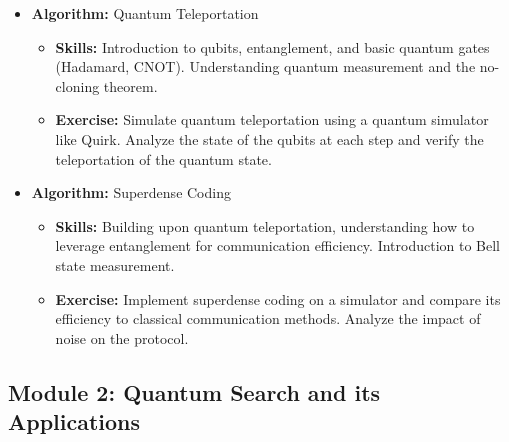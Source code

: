 \begin{itemize}
    \item \textbf{Algorithm:} Quantum Teleportation
    \begin{itemize}
        \item \textbf{Skills:} Introduction to qubits, entanglement, and basic quantum gates (Hadamard, CNOT). Understanding quantum measurement and the no-cloning theorem.
        \item \textbf{Exercise:} Simulate quantum teleportation using a quantum simulator like Quirk. Analyze the state of the qubits at each step and verify the teleportation of the quantum state.
    \end{itemize}
    
    \item \textbf{Algorithm:} Superdense Coding
    \begin{itemize}
        \item \textbf{Skills:} Building upon quantum teleportation, understanding how to leverage entanglement for communication efficiency. Introduction to Bell state measurement.
        \item \textbf{Exercise:} Implement superdense coding on a simulator and compare its efficiency to classical communication methods. Analyze the impact of noise on the protocol.
    \end{itemize}
\end{itemize}

\subsection{Module 2: Quantum Search and its Applications}

